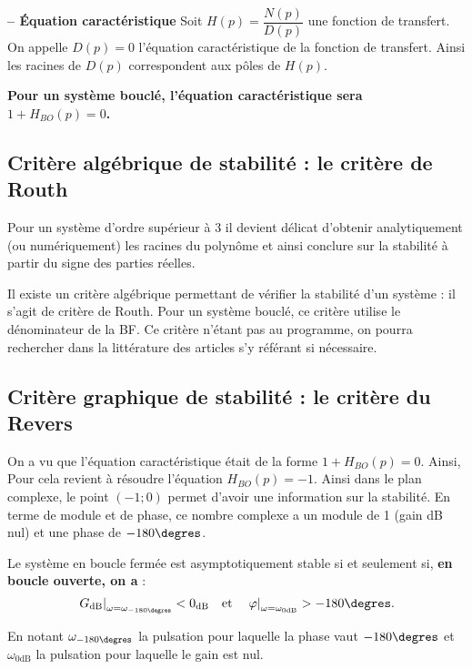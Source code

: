 \begin{defi}\textbf{ -- Équation caractéristique}
Soit $H(p)=\dfrac{N(p)}{D(p)}$ une fonction de transfert. On appelle $D(p)=0$ l'équation caractéristique de la fonction de transfert. Ainsi les racines de $D(p)$ correspondent aux pôles de $H(p)$.
\end{defi}

\textbf{Pour un système bouclé, l'équation caractéristique sera $1+H_{BO}(p)=0$.}

\subsection{Critère algébrique de stabilité : le critère de Routh}
Pour un système d'ordre supérieur à 3 il devient délicat d'obtenir analytiquement (ou numériquement) les racines du polynôme et ainsi conclure sur la stabilité à partir du signe des parties réelles. 

Il existe un critère algébrique permettant de vérifier la stabilité d'un système : il s'agit de critère de Routh. Pour un système bouclé, ce critère utilise le dénominateur de la BF. Ce critère n'étant pas au programme, on pourra rechercher dans la littérature des articles s'y référant si nécessaire. 

\subsection{Critère graphique de stabilité : le critère du Revers}
 On a vu que l'équation caractéristique était de la forme $1+H_{BO}(p)=0$. Ainsi, Pour cela revient à résoudre l'équation $H_{BO}(p)=-1$. Ainsi dans le plan complexe, le point $(-1;0)$ permet d'avoir une information sur la stabilité. En terme de module et de phase, ce nombre complexe a un module de 1 (gain dB nul) et une phase de $-180\degres$.
 
\begin{resultat}
Le système en boucle fermée est asymptotiquement stable si et seulement si, \textbf{en boucle ouverte, on a} :
$$
\left. G_{\text{dB}} \right|_{\omega=\omega_{-180\degres}}<0_{\text{dB}} 
\quad
\text{et}
\quad
\left. \varphi \right|_{\omega=\omega_{0\text{dB}}}>-180\degres.
$$

En notant $\omega_{-180\degres}$ la pulsation pour laquelle la phase vaut $-180\degres$ et $\omega_{0\text{dB}}$ la pulsation pour laquelle le gain est nul.
\end{resultat}
 
